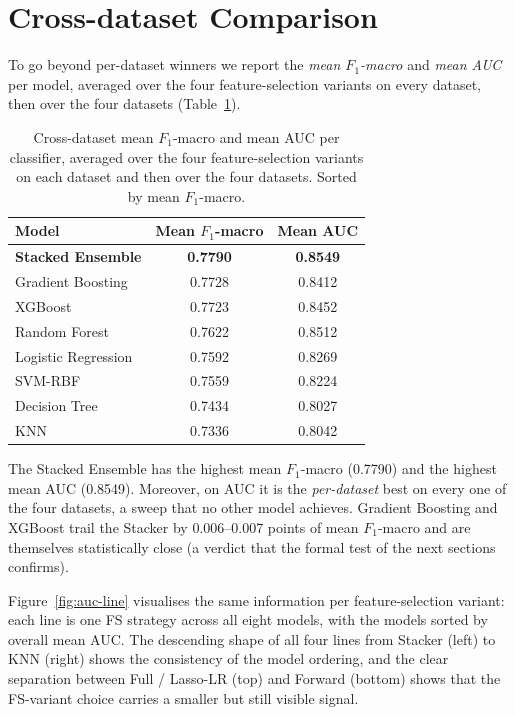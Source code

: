 \section{Cross-dataset Comparison}
\label{sec:cross-dataset}

To go beyond per-dataset winners we report the
\emph{mean $F_1$-macro} and \emph{mean AUC} per model, averaged
over the four feature-selection variants on every dataset, then
over the four datasets (Table~\ref{tab:cross-dataset}).

\begin{table}[H]
\centering
\caption{Cross-dataset mean $F_1$-macro and mean AUC per classifier,
averaged over the four feature-selection variants on each dataset
and then over the four datasets. Sorted by mean $F_1$-macro.}
\singlespacing
\label{tab:cross-dataset}
\small
\renewcommand{\arraystretch}{1.15}
\begin{tabular}{l c c}
\toprule
\textbf{Model} & \textbf{Mean $F_1$-macro} & \textbf{Mean AUC}\\
\midrule
\textbf{Stacked Ensemble} & \textbf{0.7790} & \textbf{0.8549}\\
Gradient Boosting & 0.7728 & 0.8412\\
XGBoost & 0.7723 & 0.8452\\
Random Forest & 0.7622 & 0.8512\\
Logistic Regression & 0.7592 & 0.8269\\
SVM-RBF & 0.7559 & 0.8224\\
Decision Tree & 0.7434 & 0.8027\\
KNN & 0.7336 & 0.8042\\
\bottomrule
\end{tabular}
\end{table}
The Stacked Ensemble has the highest mean $F_1$-macro (0.7790) and
the highest mean AUC (0.8549). Moreover, on AUC it is the
\emph{per-dataset} best on every one of the four datasets, a sweep
that no other model achieves. Gradient Boosting and XGBoost trail
the Stacker by 0.006--0.007 points of mean $F_1$-macro and are
themselves statistically close (a verdict that the formal test
of the next sections confirms).

Figure~\ref{fig:auc-line} visualises the same information per
feature-selection variant: each line is one FS strategy across all
eight models, with the models sorted by overall mean AUC. The
descending shape of all four lines from Stacker (left) to KNN
(right) shows the consistency of the model ordering, and the
clear separation between Full / Lasso-LR (top) and Forward
(bottom) shows that the FS-variant choice carries a smaller but
still visible signal.

